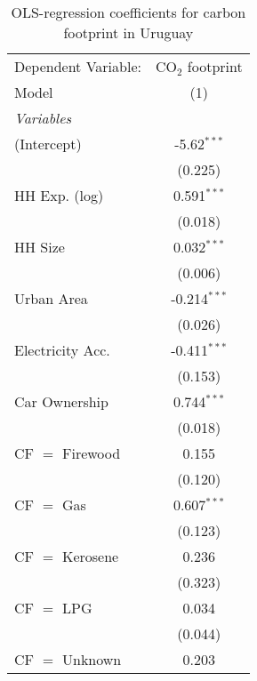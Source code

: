 
\begin{table}[htbp!]
   \centering
   \small
   \begin{adjustbox}{width = 1\textwidth, max height = 0.95\textheight, center}
      \begin{threeparttable}[b]
         \caption{\label{tab:OLS_2_URY} OLS-regression coefficients for carbon footprint in Uruguay}
         \begin{tabular}{lc}
            \tabularnewline \midrule \midrule
            Dependent Variable: & CO$_{2}$ footprint\\  
            Model               & (1)\\  
            \midrule
            \emph{Variables}\\
            (Intercept)         & -5.62$^{***}$\\   
                                & (0.225)\\   
            HH Exp. (log)       & 0.591$^{***}$\\   
                                & (0.018)\\   
            HH Size             & 0.032$^{***}$\\   
                                & (0.006)\\   
            Urban Area          & -0.214$^{***}$\\   
                                & (0.026)\\   
            Electricity Acc.    & -0.411$^{***}$\\   
                                & (0.153)\\   
            Car Ownership       & 0.744$^{***}$\\   
                                & (0.018)\\   
            CF $=$ Firewood     & 0.155\\   
                                & (0.120)\\   
            CF $=$ Gas          & 0.607$^{***}$\\   
                                & (0.123)\\   
            CF $=$ Kerosene     & 0.236\\   
                                & (0.323)\\   
            CF $=$ LPG          & 0.034\\   
                                & (0.044)\\   
            CF $=$ Unknown      & 0.203\\   

\end{tabular}
\end{threeparttable}
\end{adjustbox}
\end{table}
